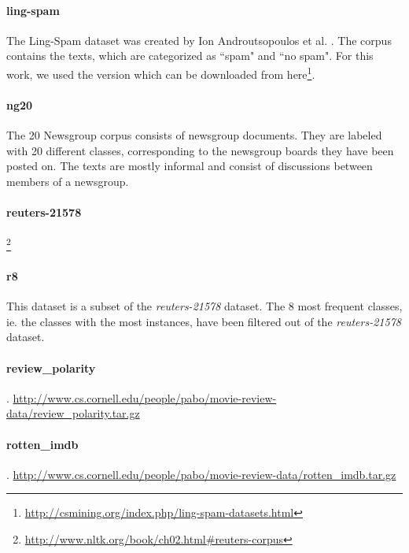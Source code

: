 
\paragraph{ling-spam}
The Ling-Spam dataset was created by Ion Androutsopoulos et al. \cite{Androutsopoulos2000}.
The corpus contains the texts, which are categorized as ``spam" and ``no spam". For this work, we used the version which can be downloaded from here\footnote{\url{http://csmining.org/index.php/ling-spam-datasets.html}}.

\paragraph{ng20}
The 20 Newsgroup corpus consists of newsgroup documents. They are labeled with 20 different classes, corresponding to the newsgroup boards they have been posted on. The texts are mostly informal and consist of discussions between members of a newsgroup.


\paragraph{reuters-21578}
\footnote{\url{http://www.nltk.org/book/ch02.html#reuters-corpus}}

\paragraph{r8}
This dataset is a subset of the \textit{reuters-21578} dataset. The 8 most frequent classes, ie. the classes with the most instances, have been filtered out of the \textit{reuters-21578} dataset.

\paragraph{review\_polarity}
\cite{Pang2004}.
\url{http://www.cs.cornell.edu/people/pabo/movie-review-data/review_polarity.tar.gz}

\paragraph{rotten\_imdb}
\cite{Pang2004}.
\url{http://www.cs.cornell.edu/people/pabo/movie-review-data/rotten_imdb.tar.gz}

